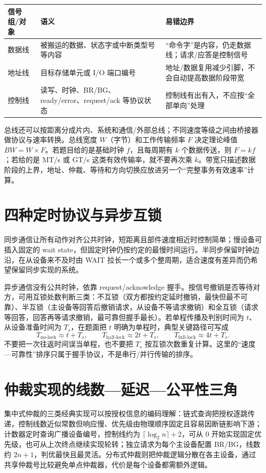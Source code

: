 \documentclass[UTF8,fontset=fandol,11pt,a4paper]{ctexart}
\begin{document}
\begin{center}\small
\begin{tabularx}{\linewidth}{L{2.4cm}YY}
\toprule
信号组/对象 & 语义 & 易错边界\\\midrule
数据线 & 被搬运的数据、状态字或中断类型号等内容 & “命令字”是内容，仍走数据线；请求/应答是控制信号\\
地址线 & 目标存储单元或 I/O 端口编号 & 地址/数据复用减少引脚，不会自动提高数据阶段带宽\\
控制线 & 读写、时钟、BR/BG、ready/error、request/ack 等协议状态 & 控制线有出有入，不应按“全部单向”处理\\
\bottomrule
\end{tabularx}
\end{center}

总线还可以按距离分成片内、系统和通信/外部总线；不同速度等级之间由桥接器做协议与速率转换。总线宽度 $W$（字节）和工作传输频率 $F$ 决定理论峰值 $BW=W\times F$。若题目给的是基础时钟 $f$，且每周期有 $k$ 个数据传送，则 $F=kf$；若给的是 MT/s 或 GT/s 这类有效传输率，就不要再次乘 $k$。带宽只描述数据阶段的上界，地址、仲裁、等待和方向切换应放进另一个“完整事务有效速率”计算。

\section{四种定时协议与异步互锁}
同步通信让所有动作对齐公共时钟，短距离且部件速度相近时控制简单；慢设备可插入固定的 wait state，但固定时钟仍按约定的最慢时间运行。半同步保留时钟边沿，在从设备来不及时由 WAIT 拉长一个或多个整周期，适合速度有差异而仍希望保留同步实现的系统。

异步通信没有公共时钟，依靠 request/acknowledge 握手。按信号撤销是否等待对方，可用互锁处数判断三类：不互锁（双方都按约定延时撤销，最快但最不可靠）、半互锁（主设备等回答后撤销请求，从设备不等请求撤销）和全互锁（请求等回答，回答再等请求撤销，最可靠但握手最长）。若单程传播及判别时间为 $t$、从设备准备时间为 $T_s$，在题面把 $t$ 明确为单程时，典型关键路径可写成
\[
T_{\text{no-lock}}\approx t+T_s,\qquad
T_{\text{half-lock}}\approx 2t+T_s,\qquad
T_{\text{full-lock}}\approx 4t+T_s.
\]
不要把一次往返时间误当单程，也不要把 $T_s$ 按互锁次数重复计算。这里的“速度—可靠性”排序只属于握手协议，不是串行/并行传输的排序。

\section{仲裁实现的线数—延迟—公平性三角}
集中式仲裁的三类经典实现可以按授权信息的编码理解：链式查询把授权逐跳传递，控制线数近似常数但响应慢、优先级由物理顺序固定且容易因断链影响下游；计数器定时查询广播设备编号，控制线约为 $\lceil\log_2 n\rceil+2$，可从 0 开始实现固定优先级，也可从上次终点继续实现轮转；独立请求为每个主设备配置 BR/BG，线数约 $2n+1$，判优最快且最灵活。分布式仲裁则把仲裁逻辑分散在各主设备，通过共享仲裁号比较避免单点仲裁器，代价是每个设备都需额外逻辑。
\end{document}
